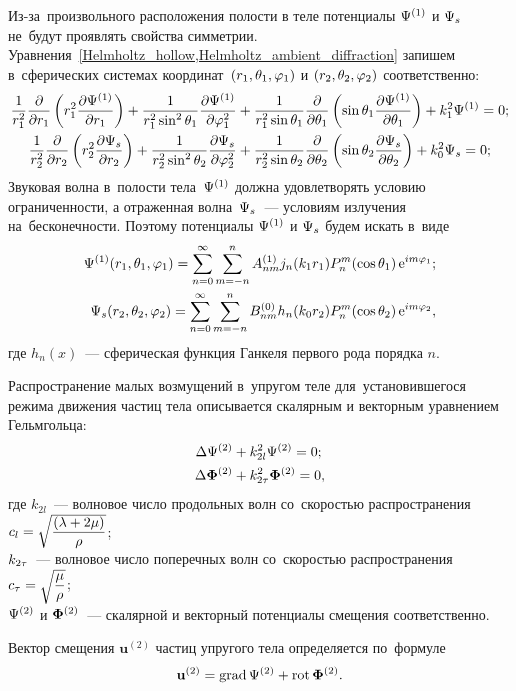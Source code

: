 Из-за~произвольного расположения полости в теле потенциалы $\P^{(1)}$ и $\P_s$ не~будут проявлять свойства симметрии.
Уравнения~\cref{Helmholtz_hollow,Helmholtz_ambient_diffraction} запишем в~сферических системах координат~$(r_1, \Q_1, \f_1)$ и $(r_2, \Q_2, \f_2)$ соответственно:
\begin{align}
\fr1{r_1^2}\fr\de{\de r_1}\left(r_1^2 \fr{\de\P^{(1)}}{\de r_1}\right) + \fr1{r_1^2\sin^2\Q_1}\fr{\de\P^{(1)}}{\de\f_1^2} &+ \fr1{r_1^2\sin\Q_1}\fr\de{\de\Q_1} \left(\sin\Q_1 \fr{\de\P^{(1)}}{\de\Q_1}\right) + k_1^2\P^{(1)} = 0;\\
\fr1{r_2^2}\fr\de{\de r_2}\left(r_2^2 \fr{\de\P_s}{\de r_2}\right) + \fr1{r_2^2\sin^2\Q_2}\fr{\de\P_s}{\de\f_2^2} &+ \fr1{r_2^2\sin\Q_2}\fr\de{\de\Q_2} \left(\sin\Q_2 \fr{\de\P_s}{\de\Q_2}\right) + k_0^2\P_s = 0;
\end{align}
Звуковая волна в~полости тела~$\P^{(1)}$ должна удовлетворять условию ограниченности, а отраженная волна~$\P_s$~--- условиям излучения на~бесконечности. Поэтому потенциалы $\P^{(1)}$ и $\P_s$ будем искать в~виде 
\begin{align}
\P^{(1)}(r_1, \Q_1, \f_1) = \sum\limits_{n = 0}^\infty \sum\limits_{m = -n}^n A_{nm}^{(1)} j_n(k_1 r_1) P_n^m(\cos\Q_1)\e^{im\f_1};\\
\P_s(r_2, \Q_2, \f_2) = \sum\limits_{n = 0}^\infty \sum\limits_{m = -n}^n B_{nm}^{(0)} h_n(k_0 r_2) P_n^m(\cos\Q_2)\e^{im\f_2},
\end{align}
где $h_n(x)$~--- сферическая функция Ганкеля первого рода порядка $n$.

Распространение малых возмущений в~упругом теле для~установившегося режима движения частиц тела описывается скалярным и векторным уравнением Гельмгольца:
\begin{align}
\Lap\P^{(2)} &+ k_{2l}^2\P^{(2)} = 0;\label{Helmholtz_scalar}\\
\Lap\F^{(2)} &+ k_{2\t}^2\F^{(2)} = 0,\label{Helmholtz_vector}
\end{align}
где $k_{2l}$~--- волновое число продольных волн со~скоростью распространения \break 
$c_l = \sqrt{\df{(\la + 2\mu)}\r}$;\\
$k_{2\t}$~--- волновое число поперечных волн со~скоростью распространения
$c_\t = \sqrt{\df\mu\r}$;\\
$\P^{(2)}$ и $\F^{(2)}$~--- скалярной и векторный потенциалы смещения соответственно.

Вектор смещения $\mathbf{u}^{(2)}$ частиц упругого тела определяется по~формуле
$$
\mathbf{u}^{(2)} = \grad \P^{(2)} + \rot \F^{(2)}.
$$

